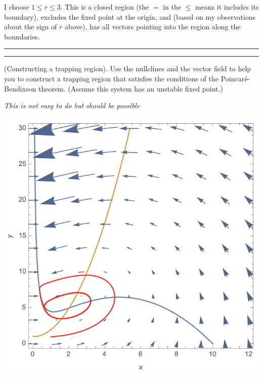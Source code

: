 \documentclass[12pt,letterpaper,noanswers]{exam}
\begin{document}
I choose $1 \leq r \leq 3$.  This is a closed region (the $=$ in the $\leq$ means it includes its boundary), excludes the fixed point at the origin, and (based on my observations about the sign of $\dot r$ above), has all vectors pointing into the region along the boundaries.


\vspace{0.2cm}
\hrule
\vspace{0.2cm}





\eject



\vspace{0.2cm}

\hrule
\vspace{0.2cm}

\begin{questions}
  



\question (Constructing a trapping region). Use the nullclines and the vector field to help you to construct a trapping region that satisfies the conditions of the Poincar\'e-Bendixson theorem.  (Assume this system has an unstable fixed point.)

\emph{This is not easy to do but should be possible}

\includegraphics{img/C14trappingp1.png}





\end{questions}
\end{document}
